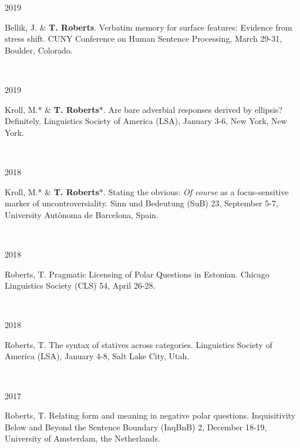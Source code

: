 \documentclass[12pt]{article} %
\begin{document}
\begin{minipage}[t]{3cm}
2019
\end{minipage}
\begin{minipage}[t]{\smallertextwidth}
Bellik, J. \& \textbf{T. Roberts}. Verbatim memory for surface features: Evidence from stress shift. CUNY Conference on Human Sentence Processing, March 29-31, Boulder, Colorado. \end{minipage}\\

\begin{minipage}[t]{3cm}
2019
\end{minipage}
\begin{minipage}[t]{\smallertextwidth}
Kroll, M.* \& \textbf{T. Roberts}*. Are bare adverbial responses derived by ellipsis? Definitely. Linguistics Society of America (LSA), January 3-6, New York, New York. \end{minipage}\\

\begin{minipage}[t]{3cm}
2018
\end{minipage}
\begin{minipage}[t]{\smallertextwidth}
Kroll, M.* \& \textbf{T. Roberts}*.  Stating the obvious: \emph{Of course} as a focus-sensitive marker of uncontroversiality. Sinn und Bedeutung (SuB) 23, September 5-7, University Autònoma de Barcelona, Spain. \end{minipage}\\

\begin{minipage}[t]{3cm}
2018
\end{minipage}
\begin{minipage}[t]{\smallertextwidth}
Roberts, T. Pragmatic Licensing of Polar Questions in Estonian. Chicago Linguistics Society (CLS) 54, April 26-28. \end{minipage}\\

\begin{minipage}[t]{3cm}
2018
\end{minipage}
\begin{minipage}[t]{\smallertextwidth}
Roberts, T. The syntax of statives across categories. Linguistics Society of America (LSA), January 4-8, Salt Lake City, Utah. \end{minipage}\\

\begin{minipage}[t]{3cm}
2017
\end{minipage}
\begin{minipage}[t]{\smallertextwidth}
Roberts, T. Relating form and meaning in negative polar questions. Inquisitivity Below and Beyond the Sentence Boundary (InqBnB) 2, December 18-19, University of Amsterdam, the Netherlands. \end{minipage}\\
\end{document}
